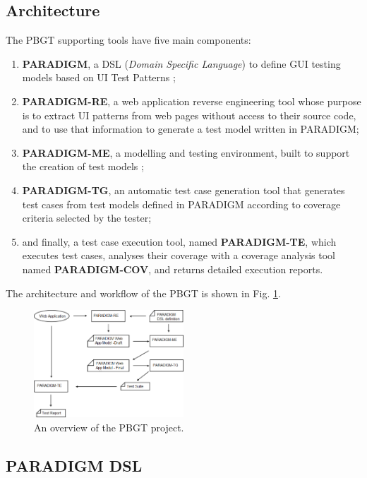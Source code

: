 \documentclass[10pt, conference, compsocconf]{IEEEtran}
\begin{document}
\subsection{Architecture}
The PBGT supporting tools have five main components: 
\begin{enumerate}
\item \textbf{PARADIGM}, a DSL (\textit{Domain Specific Language}) to define GUI testing models based on UI Test Patterns \cite{enase14}; 
\item \textbf{PARADIGM-RE}, a web application reverse engineering tool whose purpose is to extract UI patterns from web pages without access to their source code, and to use that information to generate a test model written in PARADIGM; 
\item \textbf{PARADIGM-ME}, a modelling and testing environment, built to support the creation of test models \cite{conf_icst_MonteiroP13}; 
\item  \textbf{PARADIGM-TG}, an automatic test case generation tool that generates test cases from test models defined in PARADIGM according to coverage criteria selected by the tester; 
\item and finally, a test case execution tool, named \textbf{PARADIGM-TE}, which executes test cases, analyses their coverage with a coverage analysis tool named \textbf{PARADIGM-COV}\cite{vilela2014cov}, and returns detailed execution reports. 
\end{enumerate}

The architecture and workflow of the PBGT is shown in Fig. \ref{fig:pbgt}.
\begin{figure}[!htb]
\centering
\includegraphics[width=0.5\textwidth]{pbgt}
\caption{An overview of the PBGT project.}
\label{fig:pbgt}
\end{figure}

\subsection{PARADIGM DSL}\label{sec:dsl}
\end{document}
